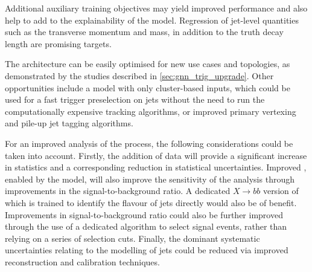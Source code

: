 Additional auxiliary training objectives may yield improved performance and also help to add to the explainability of the model.
Regression of jet-level quantities such as the transverse momentum and mass, in addition to the truth \bhadron decay length are promising targets.

The \GNN architecture can be easily optimised for new use cases and topologies, as demonstrated by the studies described in \cref{sec:gnn_trig_upgrade}.
Other opportunities include a model with only cluster-based inputs, which could be used for a fast trigger preselection on jets without the need to run the computationally expensive tracking algorithms, or improved primary vertexing and pile-up jet tagging algorithms.

For an improved analysis of the \VHbb process, the following considerations could be taken into account.
Firstly, the addition of \runthree data will provide a significant increase in statistics and a corresponding reduction in statistical uncertainties.
Improved \btagging, enabled by the \GNN model, will also improve the sensitivity of the analysis through improvements in the signal-to-background ratio.
A dedicated $X \rightarrow bb$ version of \GNN which is trained to identify the flavour of \largeR jets directly would also be of benefit.
Improvements in signal-to-background ratio could also be further improved through the use of a dedicated algorithm to select signal events, rather than relying on a series of selection cuts.
Finally, the dominant systematic uncertainties relating to the modelling of \largeR jets could be reduced via improved reconstruction and calibration techniques.
